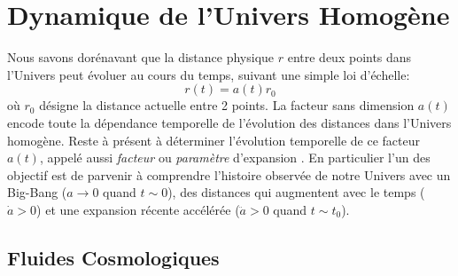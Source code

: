 
\chapter{Dynamique de l'Univers Homogène}
Nous savons dorénavant que la distance physique  $r$ entre deux points dans l'Univers peut évoluer au cours du temps, suivant une simple loi d'échelle:
\begin{equation}
r(t)=a(t)r_0
\end{equation}
où $r_0$ désigne la distance actuelle entre 2 points. La facteur sans dimension $a(t)$ encode toute la dépendance temporelle de l'évolution des distances dans l'Univers homogène. Reste à présent à déterminer l'évolution temporelle de ce facteur $a(t)$, appelé aussi \textit{facteur} ou \textit{paramètre} d'expansion .
En particulier l'un des objectif est de parvenir à comprendre l'histoire observée de notre Univers avec un Big-Bang ($a\rightarrow 0$ quand $t\sim 0$), des distances qui augmentent avec le temps ($\dot a>0$) et une expansion récente accélérée ($\ddot a>0$ quand $t\sim t_0$).

\section{Fluides Cosmologiques}

